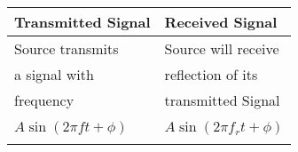 \begin{tabular}{ | m{2.5cm} | m{2.5cm} | } 
  \hline
 Transmitted Signal & Received Signal\\
 \hline
 Source transmits & Source will receive  \\
  a signal with & reflection of its \\
   frequency &transmitted Signal\\
   \hline
    & \\
$A\sin{(2 \pi f t +\phi)}$&$A\sin{(2 \pi f_r t +\phi)} $ \\
    & \\
\hline
\end{tabular}\\
\caption{}
\label{Table:4}